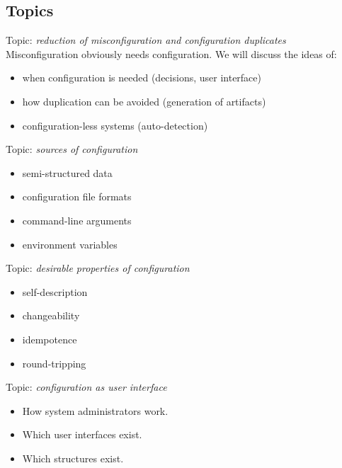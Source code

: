 \documentclass{beamer}
\begin{document}
\subsection{Topics}
\begin{frame}
	Topic: \textit{reduction of misconfiguration and configuration duplicates} \\
	Misconfiguration obviously needs configuration.
	We will discuss the ideas of:
	\begin{itemize}
		\item when configuration is needed (decisions, user interface)
		\item how duplication can be avoided (generation of artifacts)
		\item configuration-less systems (auto-detection)
	\end{itemize}
\end{frame}

\begin{frame}
	Topic: \textit{sources of configuration}
	\begin{itemize}
		\item semi-structured data
		\item configuration file formats
		\item command-line arguments
		\item environment variables
	\end{itemize}
\end{frame}

\begin{frame}
	Topic: \textit{desirable properties of configuration}
	\begin{itemize}
		\item self-description
		\item changeability
		\item idempotence
		\item round-tripping
	\end{itemize}
\end{frame}

\begin{frame}
	Topic: \textit{configuration as user interface}
	\begin{itemize}
		\item How system administrators work.
		\item Which user interfaces exist.
		\item Which structures exist.
	\end{itemize}
\end{frame}
\end{document}
